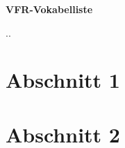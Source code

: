 \documentclass[10pt,a4paper]{article}
\begin{document}
\setlength{\parindent}{0pt}

\begin{center}
\huge
\vspace{1cm}

\textbf{VFR-Vokabelliste}
\normalsize

\vspace{.5cm}
\the\day.\the\month.\the\year
\end{center}



%


\tableofcontents

\newpage %


\section{Abschnitt 1}

\newpage
\section{Abschnitt 2}





\end{document}
